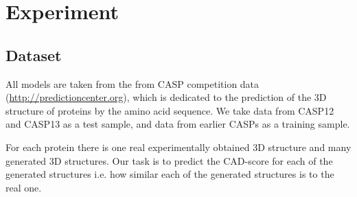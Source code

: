 \documentclass[12pt,twoside]{article}
\begin{document}
	\section{Experiment}
	\subsection{Dataset}
	All models are taken from the from CASP competition data (\url{http://predictioncenter.org}), which is dedicated to the prediction 
	of the 3D structure of proteins by the amino acid sequence. We take data from CASP12 and CASP13 as a test sample, and data from
	earlier CASPs as a training sample.

	For each protein there is one real experimentally obtained 3D structure and many generated 3D structures. Our task is to predict 
	the CAD-score \cite{Olechnovic2012} for each of the generated structures i.e. how similar each of the generated structures is to the real one.
	
	
	
	
	
	
	
	
	
\end{document}
